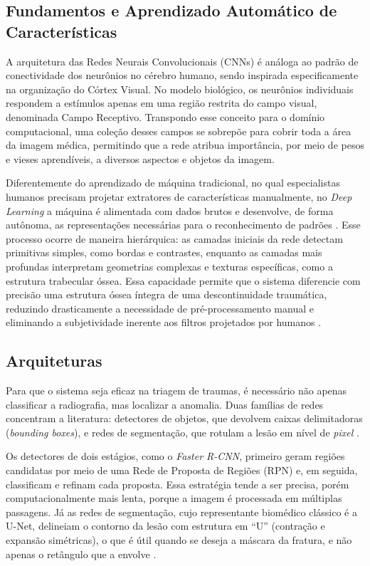 \documentclass[12pt,oneside,a4paper,chapter=TITLE,section=TITLE,sumario=tradicional]{abntex2}
\begin{document}
\subsection{Fundamentos e Aprendizado Automático de Características}

A arquitetura das Redes Neurais Convolucionais (CNNs) é análoga ao padrão de conectividade dos neurônios no cérebro humano, sendo inspirada especificamente na organização do Córtex Visual. No modelo biológico, os neurônios individuais respondem a estímulos apenas em uma região restrita do campo visual, denominada Campo Receptivo. Transpondo esse conceito para o domínio computacional, uma coleção desses campos se sobrepõe para cobrir toda a área da imagem médica, permitindo que a rede atribua importância, por meio de pesos e vieses aprendíveis, a diversos aspectos e objetos da imagem.

Diferentemente do aprendizado de máquina tradicional, no qual especialistas humanos precisam projetar extratores de características manualmente, no \textit{Deep Learning} a máquina é alimentada com dados brutos e desenvolve, de forma autônoma, as representações necessárias para o reconhecimento de padrões \cite{viso2024,ibm2024}. Esse processo ocorre de maneira hierárquica: as camadas iniciais da rede detectam primitivas simples, como bordas e contrastes, enquanto as camadas mais profundas interpretam geometrias complexas e texturas específicas, como a estrutura trabecular óssea. Essa capacidade permite que o sistema diferencie com precisão uma estrutura óssea íntegra de uma descontinuidade traumática, reduzindo drasticamente a necessidade de pré-processamento manual e eliminando a subjetividade inerente aos filtros projetados por humanos \cite{deeplearningbook2024}.

\subsection{Arquiteturas}

Para que o sistema seja eficaz na triagem de traumas, é necessário não apenas classificar a radiografia, mas localizar a anomalia. Duas famílias de redes concentram a literatura: detectores de objetos, que devolvem caixas delimitadoras (\textit{bounding boxes}), e redes de segmentação, que rotulam a lesão em nível de \textit{pixel} \cite{litjens2017survey,zhou2020}.

Os detectores de dois estágios, como o \textit{Faster R-CNN}, primeiro geram regiões candidatas por meio de uma Rede de Proposta de Regiões (RPN) e, em seguida, classificam e refinam cada proposta. Essa estratégia tende a ser precisa, porém computacionalmente mais lenta, porque a imagem é processada em múltiplas passagens. Já as redes de segmentação, cujo representante biomédico clássico é a U-Net, delineiam o contorno da lesão com estrutura em ``U'' (contração e expansão simétricas), o que é útil quando se deseja a máscara da fratura, e não apenas o retângulo que a envolve \cite{ronneberger2015,litjens2017survey}.
\end{document}
